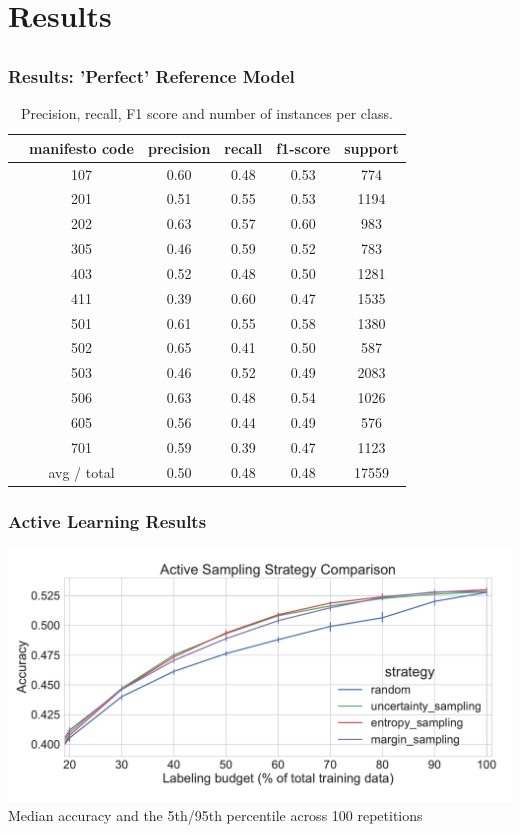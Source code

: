 \documentclass[]{beamer}
\begin{document}
\section{Results}
\subsection{}


\begin{frame}\frametitle{Results: 'Perfect' Reference Model}
\footnotesize
\begin{table}
\centering
\begin{tabular}{cccccc}
\toprule
&  manifesto code & precision  &  recall&  f1-score &  support\\
\midrule
&   107&  0.60& 0.48& 0.53&  774\\
&   201&  0.51& 0.55& 0.53& 1194\\
&   202&  0.63& 0.57& 0.60&  983\\
&   305&  0.46& 0.59& 0.52&  783\\
&   403&  0.52& 0.48& 0.50& 1281\\
&   411&  0.39& 0.60& 0.47& 1535\\
&   501&  0.61& 0.55& 0.58& 1380\\
&   502&  0.65& 0.41& 0.50&  587\\
&   503&  0.46& 0.52& 0.49& 2083\\
&   506&  0.63& 0.48& 0.54& 1026\\
&   605&  0.56& 0.44& 0.49&  576\\
&   701&  0.59& 0.39& 0.47& 1123\\
\bottomrule
& avg / total&  0.50& 0.48& 0.48&17559\\
\end{tabular}
\caption{Precision, recall, F1 score and number of instances per class. }
\label{tab:baseline_model_report} 
\end{table}

\end{frame}

\begin{frame}\frametitle{Active Learning Results}
\begin{center}
\includegraphics[width=\textwidth]{images/active_learning_manifesto.pdf} \\
Median accuracy and the 5th/95th percentile across 100 repetitions \\
\end{center}

\end{frame}
\end{document}
